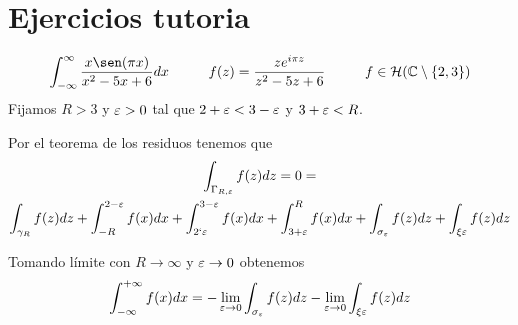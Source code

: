 \documentclass[12pt]{article}
\begin{document}
    \section{Ejercicios tutoria}

    \begin{ejercicio}
        \begin{gather*}
            \int_{-\infty}^\infty \frac{x\sen(\pi x)}{x^2-5x+6} dx \hspace{1cm} f(z) = \frac{z e^{i\pi z}}{z^2-5z+6}\hspace{1cm} f\in \cc{H}(\bb{C}\setminus \{2,3\})
        \end{gather*}
        Fijamos $R>3$ y $\varepsilon >0$ tal que $2+\varepsilon < 3-\varepsilon$ y $3+\varepsilon <R$.


        Por el teorema de los residuos tenemos que
        \begin{gather*}
            \int_{\Gamma_{R,\varepsilon}} f(z)dz = 0 = \\
            \int_{\gamma_R} f(z) dz + \int_{-R}^{2-\varepsilon} f(x) dx + \int_{2`\varepsilon}^{3-\varepsilon} f(x) dx + \int_{3+\varepsilon}^R f(x) dx + \int_{\sigma_\varepsilon}f(z) dz + \int_{\xi\varepsilon} f(z) dz
        \end{gather*}

        Tomando límite con $R\to \infty$ y $\varepsilon \to 0$ obtenemos 
        \begin{gather*}
            \int_{-\infty}^{+\infty} f(x) dx = -\lim\limits_{\varepsilon\to 0} \int_{\sigma_\varepsilon} f(z)dz - \lim\limits_{\varepsilon \to 0} \int_{\xi\varepsilon} f(z) dz 
        \end{gather*}


\end{ejercicio}
\end{document}
